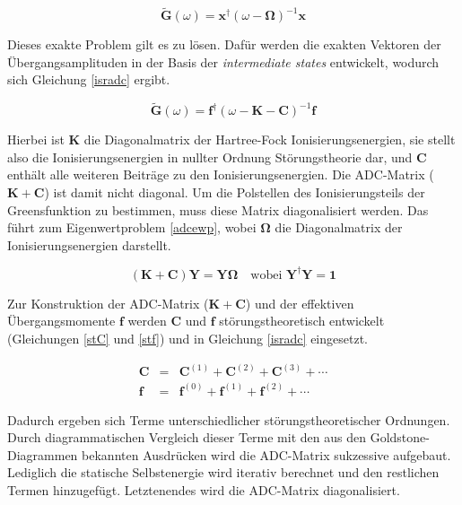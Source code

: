 \begin{equation}\label{matrixspec}
\mathbf{\tilde{G}}(\omega) = \mathbf{x}^\dagger(\omega-\mathbf{\Omega})^{-1}\mathbf{x}
\end{equation}

Dieses exakte Problem gilt es zu lösen. Dafür werden die exakten Vektoren der Übergangsamplituden in der Basis der \emph{intermediate states} entwickelt, wodurch sich Gleichung \ref{isradc} ergibt.\cite{Mertins96_1}

\begin{equation}\label{isradc}
\mathbf{\tilde{G}}(\omega) = \mathbf{f}^\dagger(\omega-\mathbf{K}-\mathbf{C})^{-1}\mathbf{f}
\end{equation}

Hierbei ist $\mathbf{K}$ die Diagonalmatrix der Hartree-Fock Ionisierungsenergien, sie stellt also die Ionisierungsenergien in nullter Ordnung Störungstheorie dar, und $\mathbf{C}$ enthält alle weiteren Beiträge zu den Ionisierungsenergien. Die ADC-Matrix ($\mathbf{K}+\mathbf{C}$) ist damit nicht diagonal. Um die Polstellen des Ionisierungsteils der Greensfunktion zu bestimmen, muss diese Matrix diagonalisiert werden. Das führt zum Eigenwertproblem \ref{adcewp}, wobei $\mathbf{\Omega}$ die Diagonalmatrix der Ionisierungsenergien darstellt.

\begin{equation}\label{adcewp}
(\mathbf{K}+\mathbf{C}) \mathbf{Y} = \mathbf{Y}\mathbf{\Omega} \quad\text{wobei } \mathbf{Y}^\dagger\mathbf{Y}=\mathbf{1}
\end{equation}

Zur Konstruktion der ADC-Matrix ($\mathbf{K}+\mathbf{C}$) und der effektiven Übergangsmomente $\mathbf{f}$ werden $\mathbf{C}$ und $\mathbf{f}$ störungstheoretisch entwickelt (Gleichungen \ref{stC} und \ref{stf}) und in Gleichung \ref{isradc} eingesetzt.

\begin{eqnarray}
\mathbf{C} &=& \mathbf{C}^{(1)} + \mathbf{C}^{(2)} + \mathbf{C}^{(3)} + \cdots\label{stC}\\
\mathbf{f} &=& \mathbf{f}^{(0)} + \mathbf{f}^{(1)} + \mathbf{f}^{(2)} + \cdots\label{stf}
\end{eqnarray}

Dadurch ergeben sich Terme unterschiedlicher störungstheoretischer Ordnungen. Durch diagrammatischen Vergleich dieser Terme mit den aus den Goldstone-Diagrammen bekannten Ausdrücken wird die ADC-Matrix sukzessive aufgebaut. Lediglich die statische Selbstenergie wird iterativ berechnet und den restlichen Termen hinzugefügt. Letztenendes wird die ADC-Matrix diagonalisiert.

